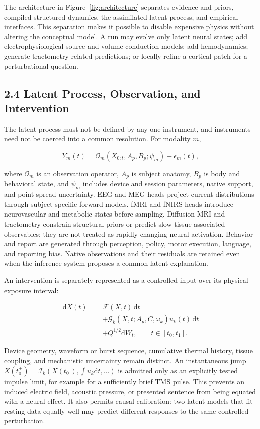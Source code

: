 The architecture in Figure~\ref{fig:architecture} separates evidence and
priors, compiled structured dynamics, the assimilated latent process, and
empirical interfaces. This separation makes it possible to disable expensive
physics without altering the conceptual model. A run may evolve only latent
neural states; add electrophysiological source and volume-conduction models;
add hemodynamics; generate tractometry-related predictions; or locally refine
a cortical patch for a perturbational question.

\ArchitectureFigure

\subsection{2.4 Latent Process, Observation, and Intervention}

The latent process must not be defined by any one instrument, and instruments
need not be coerced into a common resolution. For modality \(m\),

\[
Y_m(t)=\mathcal{O}_m\!\left(X_{0:t},A_p,B_p;\psi_m\right)
+\epsilon_m(t),
\]

where \(\mathcal{O}_m\) is an observation operator, \(A_p\) is subject anatomy,
\(B_p\) is body and behavioral state, and \(\psi_m\) includes device and
session parameters, native support, and point-spread uncertainty. EEG and MEG
heads project current distributions through
subject-specific forward models. fMRI and fNIRS heads introduce neurovascular
and metabolic states before sampling. Diffusion MRI and tractometry constrain
structural priors or predict slow tissue-associated observables; they are not
treated as rapidly changing neural activation. Behavior and report are
generated through perception, policy, motor execution, language, and reporting
bias. Native observations and their residuals are retained even when the
inference system proposes a common latent explanation.

An intervention is separately represented as a controlled input over its
physical exposure interval:

\[
\begin{aligned}
\mathrm dX(t)={}&\mathcal F(X,t)\,\mathrm dt\\
&+\mathcal G_k\!\left(X,t;A_p,C,\omega_k\right)
u_k(t)\,\mathrm dt\\
&+Q^{1/2}\mathrm dW_t,
\qquad t\in[t_0,t_1].
\end{aligned}
\]

Device geometry, waveform or burst sequence, cumulative thermal history,
tissue coupling, and mechanistic uncertainty remain distinct. An
instantaneous jump
\(X(t_0^+)=\mathcal I_k(X(t_0^-),\int u_k\mathrm dt,\ldots)\) is admitted only
as an explicitly tested impulse limit, for example for a sufficiently brief
TMS pulse. This prevents an induced electric field, acoustic pressure, or
presented sentence from being equated with a neural effect. It also permits
causal calibration: two latent models that fit resting data equally well may
predict different responses to the same controlled perturbation.

